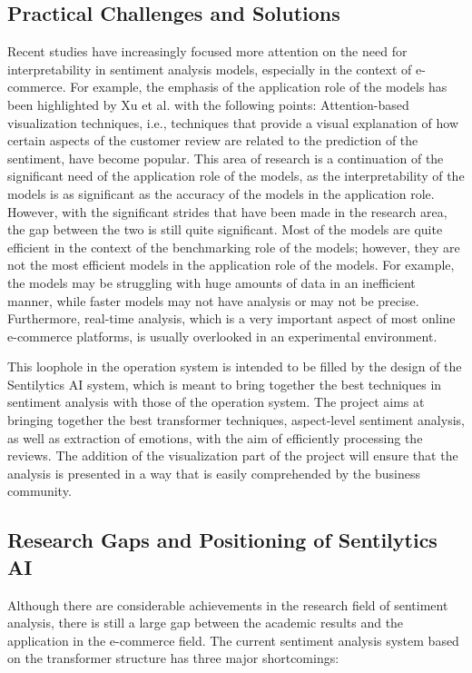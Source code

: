 \documentclass[11pt,a4paper]{article}
\begin{document}
\subsection{Practical Challenges and Solutions}

Recent studies have increasingly focused more attention on the need for interpretability in sentiment analysis models, especially in the context of e-commerce. For example, the emphasis of the application role of the models has been highlighted by Xu et al. with the following points:
Attention-based visualization techniques, i.e., techniques that provide a visual explanation of how certain aspects of the customer review are related to the prediction of the sentiment, have become popular. This area of research is a continuation of the significant need of the application role of the models, as the interpretability of the models is as significant as the accuracy of the models in the application role.
However, with the significant strides that have been made in the research area, the gap between the two is still quite significant.
Most of the models are quite efficient in the context of the benchmarking role of the models; however, they are not the most efficient models in the application role of the models. For example, the models may be struggling with huge amounts of data in an inefficient manner, while faster models may not have analysis or may not be precise. Furthermore, real-time analysis, which is a very important aspect of most online e-commerce platforms, is usually overlooked in an experimental environment.

This loophole in the operation system is intended to be filled by the design of the Sentilytics AI system, which is meant to bring together the best techniques in sentiment analysis with those of the operation system. The project aims at bringing together the best transformer techniques, aspect-level sentiment analysis, as well as extraction of emotions, with the aim of efficiently processing the reviews. The addition of the visualization part of the project will ensure that the analysis is presented in a way that is easily comprehended by the business community.

\subsection{Research Gaps and Positioning of Sentilytics AI}

Although there are considerable achievements in the research field of sentiment analysis, there is still a large gap between the academic results and the application in the e-commerce field. The current sentiment analysis system based on the transformer structure has three major shortcomings:
\end{document}
